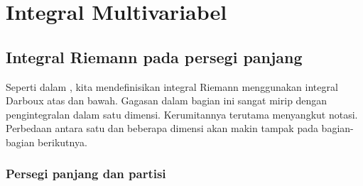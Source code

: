 \chapter{Integral Multivariabel} \label{mi:chapter}



\section{Integral Riemann pada persegi panjang}
\label{sec:rirect}



Seperti dalam , kita mendefinisikan integral Riemann
menggunakan integral Darboux atas dan bawah. Gagasan dalam bagian ini sangat
mirip dengan pengintegralan dalam satu dimensi. Kerumitannya terutama menyangkut
notasi. Perbedaan antara satu dan beberapa dimensi akan makin tampak pada
bagian-bagian berikutnya.

\subsection{Persegi panjang dan partisi}

